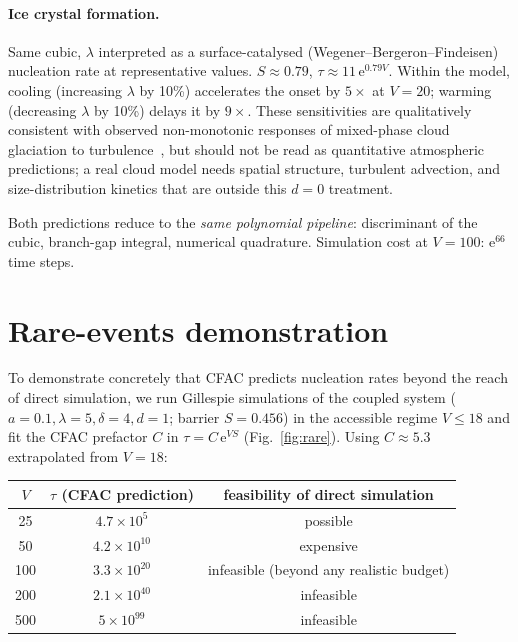 \documentclass[11pt,a4paper]{article}
\newcommand{\ee}{\mathrm{e}}
\theoremstyle{plain}
\begin{document}
\paragraph{Ice crystal formation.}
Same cubic, $\lambda$ interpreted as a surface-catalysed
(Wegener--Bergeron--Findeisen) nucleation rate at representative
values.  $S \approx 0.79$, $\tau \approx 11\,\ee^{0.79 V}$.
Within the model, cooling (increasing $\lambda$ by 10\%)
accelerates the onset by $5\times$ at $V = 20$; warming
(decreasing $\lambda$ by 10\%) delays it by $9\times$.  These
sensitivities are qualitatively consistent with observed
non-monotonic responses of mixed-phase cloud glaciation to
turbulence~\citep{PinskyKhain}, but should not be read as
quantitative atmospheric predictions; a real cloud model needs
spatial structure, turbulent advection, and size-distribution
kinetics that are outside this $d = 0$ treatment.

Both predictions reduce to the \emph{same polynomial pipeline}:
discriminant of the cubic, branch-gap integral, numerical
quadrature.
Simulation cost at $V=100$: $\ee^{66}$ time steps.

\section{Rare-events demonstration}
\label{sec:rare}

To demonstrate concretely that CFAC predicts nucleation rates
beyond the reach of direct simulation, we run Gillespie
simulations of the coupled system ($a{=}0.1, \lambda{=}5, \delta{=}4,
d{=}1$; barrier $S = 0.456$) in the accessible regime $V \leq 18$
and fit the CFAC prefactor $C$ in $\tau = C\,\ee^{V S}$
(Fig.~\ref{fig:rare}).  Using $C \approx 5.3$ extrapolated from
$V = 18$:

\begin{center}\small
\begin{tabular}{@{}ccc@{}}\toprule
$V$ & $\tau$ (CFAC prediction) & feasibility of direct simulation \\ \midrule
25  & $4.7\times 10^{5}$  & possible\\
50  & $4.2\times 10^{10}$ & expensive\\
100 & $3.3\times 10^{20}$ & infeasible (beyond any realistic budget)\\
200 & $2.1\times 10^{40}$ & infeasible\\
500 & $5\times 10^{99}$   & infeasible\\
\bottomrule\end{tabular}
\end{center}
\end{document}
